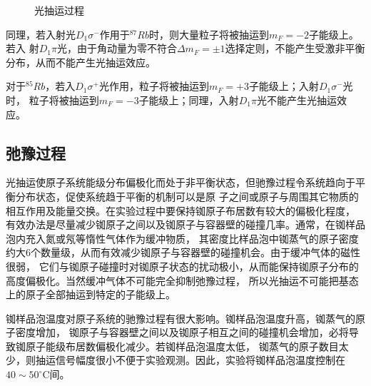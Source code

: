 \documentclass[11pt,a4paper]{article}
\begin{document}
\begin{spacing}{1.3}
\begin{CJK*}{UTF8}{gbsn}
\begin{figure}[!h]
\caption{光抽运过程}
\label{fig2-6-2}
\end{figure} 
\par
同理，若入射光$D_1\sigma^-$作用于$^{87}Rb$时，则大量粒子将被抽运到$m_F=-2$子能级上。若入
射$D_1\pi$光，由于角动量为零不符合$\Delta m_F = \pm 1$选择定则，不能产生受激非平衡分布，从而不能产生光抽运效应。\par
对于$^{85}Rb$，若入$D_1\sigma^+$光作用，粒子将被抽运到$m_F=+3$子能级上；入射$D_1\sigma^-$光时，
粒子将被抽运到$m_F=-3$子能级上；同理，入射$D_1\pi$光不能产生光抽运效应。

\subsection{弛豫过程}
光抽运使原子系统能级分布偏极化而处于非平衡状态，但驰豫过程令系统趋向于平衡分布状态，促使系统趋于平衡的机制可以是原
子之间或原子与周围其它物质的相互作用及能量交换。在实验过程中要保持铷原子布居数有较大的偏极化程度，
有效办法是尽量减少铷原子之间以及铷原子与容器壁的碰撞几率。通常，在铷样品泡内充入氮或氖等惰性气体作为缓冲物质，
其密度比样品泡中铷蒸气的原子密度约大6个数量级，从而有效减少铷原子与容器壁的碰撞机会。由于缓冲气体的磁性很弱，
它们与铷原子碰撞时对铷原子状态的扰动极小，从而能保持铷原子分布的高度偏极化。当然缓冲气体不可能完全抑制弛豫过程，
所以光抽运不可能把基态上的原子全部抽运到特定的子能级上。\par
铷样品泡温度对原子系统的驰豫过程有很大影响。铷样品泡温度升高，铷蒸气的原子密度增加，
铷原子与容器壁之间以及铷原子相互之间的碰撞机会增加，必将导致铷原子能级布居数偏极化减少。若铷样品泡温度太低，
铷蒸气的原子数目太少，则抽运信号幅度很小不便于实验观测。因此，实验将铷样品泡温度控制在$40\sim 50^{\circ}$C间。\par


\end{CJK*}
\end{spacing}
\end{document}
